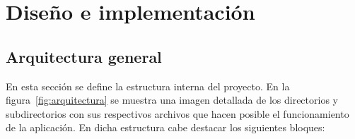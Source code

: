 \documentclass[a4paper, 12pt]{book}
\begin{document}

\cleardoublepage
\chapter{Dise\~no e implementaci\'on}

\section{Arquitectura general} 
\label{sec:arquitectura}
En esta secci\'on se define la estructura interna del proyecto. En la figura~\ref{fig:arquitectura} se muestra una imagen detallada de los directorios y 
subdirectorios con sus respectivos archivos que hacen posible el funcionamiento de la aplicaci\'on.
En dicha estructura cabe destacar los siguientes bloques:
\end{document}
